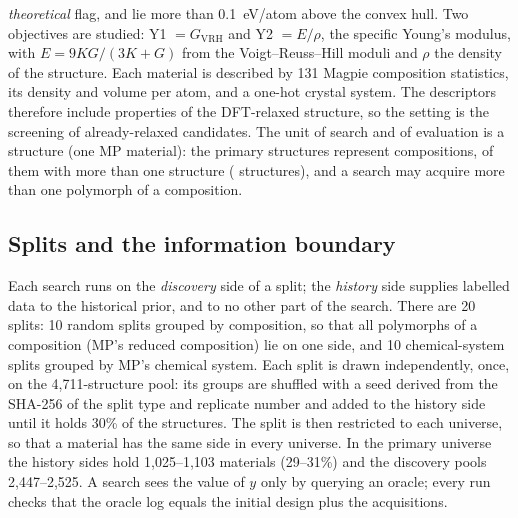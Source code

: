 \emph{theoretical} flag, and  lie more than 0.1~eV/atom above the convex hull. Two
objectives are studied: Y1 $=G_{\mathrm{VRH}}$ and Y2 $=E/\rho$, the specific Young's modulus, with
$E=9KG/(3K+G)$ from the Voigt--Reuss--Hill moduli and $\rho$ the density of the structure. Each material is described by 131
Magpie composition statistics\cite{ward2016magpie,ward2018matminer}, its density and volume per atom, and a one-hot crystal system. The descriptors
therefore include properties of the DFT-relaxed structure, so the setting is the screening of already-relaxed candidates. The unit
of search and of evaluation is a structure (one MP material): the  primary structures represent
 compositions,  of them with more than one structure
( structures), and a search may acquire more than one polymorph of a composition.

\subsection{Splits and the information boundary}\label{sec:splits}
Each search runs on the \emph{discovery} side of a split; the \emph{history} side supplies labelled data to the historical
prior, and to no other part of the search. There are 20 splits: 10 random splits grouped by composition, so that all polymorphs of
a composition (MP's reduced composition) lie on one side, and 10 chemical-system splits grouped by MP's chemical system. Each split is drawn independently, once,
on the 4,711-structure pool: its groups are shuffled with a seed derived from the SHA-256 of the split type and replicate number and
added to the history side until it holds 30\% of the structures. The split is then restricted to each universe, so that a material
has the same side in every universe. In the primary universe the history sides hold 1,025--1,103 materials (29--31\%) and the
discovery pools 2,447--2,525. A search sees the value
of $y$ only by querying an oracle; every run checks that the oracle log equals the initial design plus the acquisitions.

